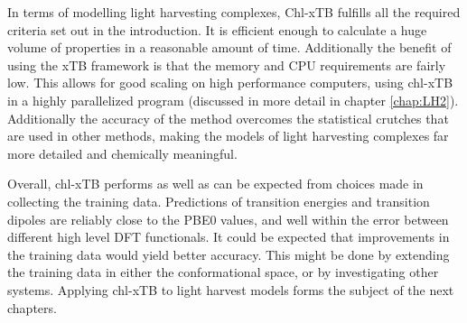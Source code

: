 In terms of modelling light harvesting complexes, Chl-xTB fulfills all the required
criteria set out in the introduction. It is efficient enough to calculate a huge
volume of properties in a reasonable amount of time. Additionally the benefit of
using the xTB framework is that the memory and CPU requirements are fairly low.
This allows for good scaling on high performance computers, using chl-xTB in a 
highly parallelized program (discussed in more detail in chapter \ref{chap:LH2}).
Additionally the accuracy of the method overcomes the statistical crutches that
are used in other methods, making the models of light harvesting complexes far more
detailed and chemically meaningful.

Overall, chl-xTB performs as well as can be expected from choices made in collecting
the training data. Predictions of transition energies and transition dipoles are
reliably close to the PBE0 values, and well within the error between different high 
level DFT functionals. It could be expected that improvements in the training data 
would yield better accuracy. This might be done by extending the training data in 
either the conformational space, or by investigating other systems. Applying chl-xTB 
to light harvest models forms the subject of the next chapters.

